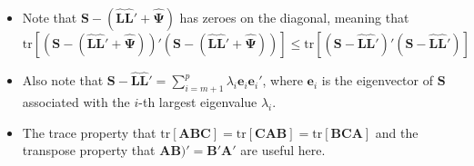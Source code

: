 \documentclass[
  letterpaper,
  DIV=11,
  numbers=noendperiod]{scrartcl}
\providecommand{\tightlist}{%
  \setlength{\itemsep}{0pt}\setlength{\parskip}{0pt}}\usepackage{longtable,booktabs,array}
\begin{document}
\begin{itemize}
\tightlist
\item
  Note that
  \(\symbf{S}-(\hat{\symbf{L}}\hat{\symbf{L}}' + \hat{\symbf{\Psi}})\)
  has zeroes on the diagonal, meaning that
  \(\mathrm{tr}[(\symbf{S}-(\hat{\symbf{L}}\hat{\symbf{L}}' + \hat{\symbf{\Psi}}))'(\symbf{S}-(\hat{\symbf{L}}\hat{\symbf{L}}' + \hat{\symbf{\Psi}}))]\leq \mathrm{tr}[(\symbf{S}-\hat{\symbf{L}}\hat{\symbf{L}}')'(\symbf{S}-\hat{\symbf{L}}\hat{\symbf{L}}')]\)
\item
  Also note that
  \(\symbf{S}-\hat{\symbf{L}}\hat{\symbf{L}}'=\sum_{i=m+1}^p\lambda_i\symbf{e}_i\symbf{e}_i'\),
  where \(\symbf{e}_i\) is the eigenvector of \(\symbf{S}\) associated
  with the \(i\)-th largest eigenvalue \(\lambda_i\).
\item
  The trace property that
  \(\mathrm{tr}[\symbf{A}\symbf{B}\symbf{C}]=\mathrm{tr}[\symbf{C}\symbf{A}\symbf{B}]=\mathrm{tr}[\symbf{B}\symbf{C}\symbf{A}]\)
  and the transpose property that
  \(\symbf{A}\symbf{B})'=\symbf{B}'\symbf{A}'\) are useful here.
\end{itemize}
\end{document}
